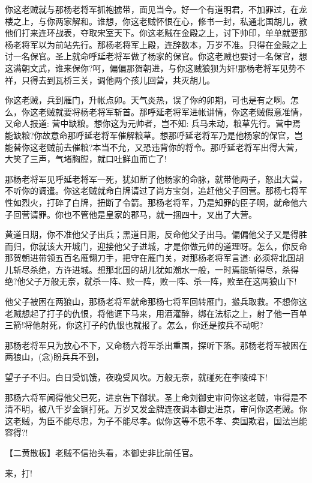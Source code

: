 {{你这老贼就与那杨老将军抓袍掳带，面见当今。好一个有道明君，不加罪过，在龙楼之上，与你两家解和。谁想，你这老贼怀恨在心，修书一封，私通北国胡儿，教他们打来连环战表，夺取宋室天下。你这老贼在金殿之上，讨下帅印，单单就要那杨老将军以为前站先行。那杨老将军上殿，连辞数本，万岁不准。只得在金殿之上讨一名保官。圣上就命呼延老将军做了杨家的保官。你这老贼也要讨一名保官，想这满朝文武，谁来保你?呵，偏偏那贺朝进，与你这贼狼狈为奸!那杨老将军见势不祥，只得去到瓦桥三关，调他两个孩儿回营，共灭胡儿。}

{你这老贼，兵到雁门，升帐点卯。天气炎热，误了你的卯期，可也是有之啊。怎么，你这老贼就要将杨老将军斩首。那呼延老将军进帐讲情，你这老贼假意准情，又命人报道: 营中缺粮。想你这为元帅者，岂不知: 兵马未动，粮草先行。营中焉能缺粮?你故意命那呼延老将军催解粮草。想那呼延老将军乃是他杨家的保官，岂能替你这老贼前去催粮?本当不允，又恐违背你的将令。那呼延老将军出得大营，大笑了三声，气堵胸膛，就口吐鲜血而亡了!}

{那杨老将军见呼延老将军一死，犹如断了他杨家的命脉，就带他两子，怒出大营，不听你的调遣。你这老贼就命白牌请过了尚方宝剑，追赶他父子回营。那杨七将军性如烈火，打碎了白牌，扭断了令箭。那杨老将军，乃是知罪的臣子啊，就命他六子回营请罪。你也不管他是皇家的郡马，就一捆四十，叉出了大营。}

{黄道日期，你不准他父子出兵；黑道日期，反命他父子出马。偏偏他父子又是得胜而归，你就该大开城门，迎接他父子进城，才是你做元帅的道理呀。怎么，你反命那贺朝进带领五百名雁翎刀手，把守在雁门关，对那杨老将军言道: 必须将北国胡儿斩尽杀绝，方许进城。想那北国的胡儿犹如潮水一般，一时焉能斩得尽，杀得绝?他父子万般无奈，就杀一阵、败一阵，败一阵、杀一阵，败至在这两狼山下!}

{他父子被困在两狼山，那杨老将军就命那杨七将军回转雁门，搬兵取救。不想你这老贼想起了打子的仇恨，将他诓下马来，用酒灌醉，绑在法标之上，射了他一百单三箭!将他射死，你这打子的仇恨也就报了。怎么，你还是按兵不动呢?}

{那杨老将军只为放心不下，又命杨六将军杀出重围，探听下落。那杨老将军被困在两狼山，({\akai 念})盼兵兵不到，

望子子不归。白日受饥饿，夜晚受风吹。万般无奈，就碰死在李陵碑下!}

{那杨六将军闻得他父已死，进京告下御状。圣上命刘御史审问你这老贼，审得是不清不明，被八千岁金锏打死。万岁又发金牌连夜调本御史进京，审问你这老贼。你这老贼，为臣不能尽忠，为子不能尽孝。似你这等不忠不孝、卖国欺君，国法岂能容得?!}

\setlength{\hangindent}{60pt} {【{\akai 二黄散板}】老贼不信抬头看，本御史非比前任官。}

{来，打!}

}
